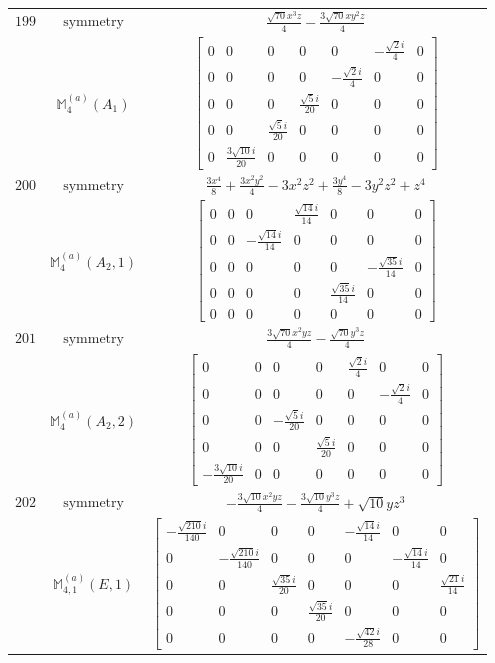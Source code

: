 \documentclass[fleqn,8pt,landscape]{jsarticle}
\begin{document}
\begin{longtable}{ccc}
$ 199 $ & $ \text{symmetry} $ & $ \frac{\sqrt{70} x^{3} z}{4} - \frac{3 \sqrt{70} x y^{2} z}{4} $ \\
$  $ & $ \mathbb{M}_{4}^{(a)}(A_{1}) $ & $ \begin{bmatrix} 0 & 0 & 0 & 0 & 0 & - \frac{\sqrt{2} i}{4} & 0 \\ 0 & 0 & 0 & 0 & - \frac{\sqrt{2} i}{4} & 0 & 0 \\ 0 & 0 & 0 & \frac{\sqrt{5} i}{20} & 0 & 0 & 0 \\ 0 & 0 & \frac{\sqrt{5} i}{20} & 0 & 0 & 0 & 0 \\ 0 & \frac{3 \sqrt{10} i}{20} & 0 & 0 & 0 & 0 & 0 \end{bmatrix} $ \\ \hline
$ 200 $ & $ \text{symmetry} $ & $ \frac{3 x^{4}}{8} + \frac{3 x^{2} y^{2}}{4} - 3 x^{2} z^{2} + \frac{3 y^{4}}{8} - 3 y^{2} z^{2} + z^{4} $ \\
$  $ & $ \mathbb{M}_{4}^{(a)}(A_{2},1) $ & $ \begin{bmatrix} 0 & 0 & 0 & \frac{\sqrt{14} i}{14} & 0 & 0 & 0 \\ 0 & 0 & - \frac{\sqrt{14} i}{14} & 0 & 0 & 0 & 0 \\ 0 & 0 & 0 & 0 & 0 & - \frac{\sqrt{35} i}{14} & 0 \\ 0 & 0 & 0 & 0 & \frac{\sqrt{35} i}{14} & 0 & 0 \\ 0 & 0 & 0 & 0 & 0 & 0 & 0 \end{bmatrix} $ \\ \hline
$ 201 $ & $ \text{symmetry} $ & $ \frac{3 \sqrt{70} x^{2} y z}{4} - \frac{\sqrt{70} y^{3} z}{4} $ \\
$  $ & $ \mathbb{M}_{4}^{(a)}(A_{2},2) $ & $ \begin{bmatrix} 0 & 0 & 0 & 0 & \frac{\sqrt{2} i}{4} & 0 & 0 \\ 0 & 0 & 0 & 0 & 0 & - \frac{\sqrt{2} i}{4} & 0 \\ 0 & 0 & - \frac{\sqrt{5} i}{20} & 0 & 0 & 0 & 0 \\ 0 & 0 & 0 & \frac{\sqrt{5} i}{20} & 0 & 0 & 0 \\ - \frac{3 \sqrt{10} i}{20} & 0 & 0 & 0 & 0 & 0 & 0 \end{bmatrix} $ \\ \hline
$ 202 $ & $ \text{symmetry} $ & $ - \frac{3 \sqrt{10} x^{2} y z}{4} - \frac{3 \sqrt{10} y^{3} z}{4} + \sqrt{10} y z^{3} $ \\
$  $ & $ \mathbb{M}_{4,1}^{(a)}(E,1) $ & $ \begin{bmatrix} - \frac{\sqrt{210} i}{140} & 0 & 0 & 0 & - \frac{\sqrt{14} i}{14} & 0 & 0 \\ 0 & - \frac{\sqrt{210} i}{140} & 0 & 0 & 0 & - \frac{\sqrt{14} i}{14} & 0 \\ 0 & 0 & \frac{\sqrt{35} i}{20} & 0 & 0 & 0 & \frac{\sqrt{21} i}{14} \\ 0 & 0 & 0 & \frac{\sqrt{35} i}{20} & 0 & 0 & 0 \\ 0 & 0 & 0 & 0 & - \frac{\sqrt{42} i}{28} & 0 & 0 \end{bmatrix} $ \\ \hline

\end{longtable}
\end{document}

